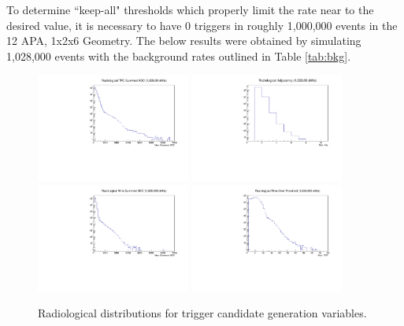 \documentclass[11pt]{article}
\begin{document}
To determine ``keep-all" thresholds which properly limit the rate near to the desired value, it is necessary to have 0 triggers in roughly 1,000,000 events in the 12 APA, 1x2x6 Geometry. The below results were obtained by simulating 1,028,000 events with the background rates outlined in Table \ref{tab:bkg}.

\begin{figure}[H]
    \centering
    \includegraphics[angle=270,width=0.45\textwidth]{Rads/rads_TADC.pdf}
    \includegraphics[angle=270,width=0.45\textwidth]{Rads/rads_max_adj_log.pdf}
    \includegraphics[angle=270,width=0.45\textwidth]{Rads/rads_WADC.pdf}
    \includegraphics[angle=270,width=0.45\textwidth]{Rads/rads_TOT_log.pdf}
    \caption{Radiological distributions for trigger candidate generation variables.}
    \label{fig:eff_atm}
\end{figure}
\end{document}
